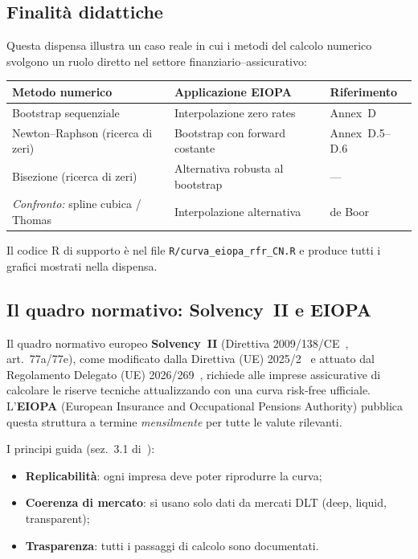 \documentclass[11pt,a4paper]{article}
\theoremstyle{plain}
\theoremstyle{definition}
\theoremstyle{remark}
\begin{document}
\subsection{Finalit\`a didattiche}

Questa dispensa illustra un caso reale in cui i metodi del calcolo numerico svolgono
un ruolo diretto nel settore finanziario--assicurativo:

\begin{center}
\renewcommand{\arraystretch}{1.3}
\begin{tabular}{lll}
\toprule
\textbf{Metodo numerico} & \textbf{Applicazione EIOPA} & \textbf{Riferimento}\\
\midrule
Bootstrap sequenziale & Interpolazione zero rates & Annex~D\\
Newton--Raphson (ricerca di zeri) & Bootstrap con forward costante & Annex~D.5--D.6\\
Bisezione (ricerca di zeri) & Alternativa robusta al bootstrap & --- \\
\emph{Confronto:} spline cubica / Thomas & Interpolazione alternativa & de Boor~\cite{deBoor1978}\\
\bottomrule
\end{tabular}
\end{center}

Il codice R di supporto \`e nel file \texttt{R/curva\_eiopa\_rfr\_CN.R} e produce
tutti i grafici mostrati nella dispensa.

\subsection{Il quadro normativo: Solvency~II e EIOPA}

Il quadro normativo europeo \textbf{Solvency~II} (Direttiva 2009/138/CE~\cite{dir2009},
art.~77a/77e), come modificato dalla Direttiva (UE) 2025/2~\cite{dir2025} e attuato dal
Regolamento Delegato (UE) 2026/269~\cite{reg2026}, richiede alle imprese assicurative di
calcolare le riserve tecniche attualizzando con una curva risk-free ufficiale.
L'\textbf{EIOPA} (European Insurance and Occupational Pensions Authority) pubblica
questa struttura a termine \emph{mensilmente} per tutte le valute rilevanti.

I principi guida (sez.~3.1 di~\cite{eiopa2026}):
\begin{itemize}
  \item \textbf{Replicabilit\`a}: ogni impresa deve poter riprodurre la curva;
  \item \textbf{Coerenza di mercato}: si usano solo dati da mercati DLT
        (deep, liquid, transparent);
  \item \textbf{Trasparenza}: tutti i passaggi di calcolo sono documentati.
\end{itemize}
\end{document}
